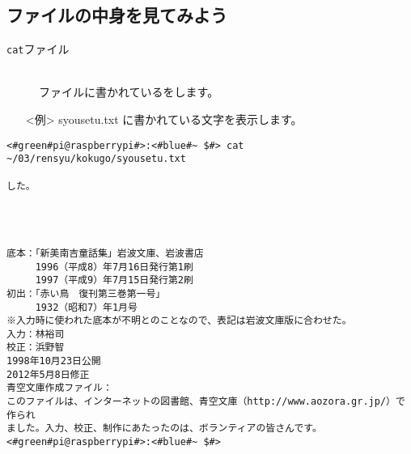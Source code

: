 \subsection{ファイルの中身を見てみよう}
\begin{description}
\item[\texttt{cat}\textvisiblespace ファイル]\mbox{}\\
ファイルに書かれているをします。
\end{description}
\begin{itemize}
\item[<例>]syousetu.txt に書かれている文字を表示します。
\end{itemize}
\begin{lstlisting}[caption=catの例, label=cat]
<#green#pi@raspberrypi#>:<#blue#~ $#> cat ~/03/rensyu/kokugo/syousetu.txt

した。




底本：「新美南吉童話集」岩波文庫、岩波書店
　　　1996（平成8）年7月16日発行第1刷
　　　1997（平成9）年7月15日発行第2刷
初出：「赤い鳥　復刊第三巻第一号」
　　　1932（昭和7）年1月号
※入力時に使われた底本が不明とのことなので、表記は岩波文庫版に合わせた。
入力：林裕司
校正：浜野智
1998年10月23日公開
2012年5月8日修正
青空文庫作成ファイル：
このファイルは、インターネットの図書館、青空文庫（http://www.aozora.gr.jp/）で作られ
ました。入力、校正、制作にあたったのは、ボランティアの皆さんです。<#green#pi@raspberrypi#>:<#blue#~ $#>
\end{lstlisting}



